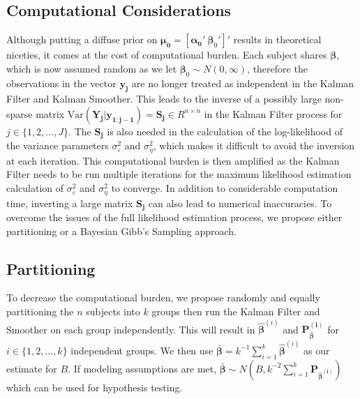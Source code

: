 \documentclass[
]{article}
\begin{document}
\hypertarget{computational-considerations}{%
\subsection{Computational Considerations}\label{computational-considerations}}

Although putting a diffuse prior on \(\boldsymbol{\mu_{0}} = [\boldsymbol{\alpha_{0}}' \ \boldsymbol{\beta}_{0}']'\) results in theoretical niceties, it comes at the cost of computational burden. Each subject shares \(\boldsymbol{\beta}\), which is now assumed random as we let \(\boldsymbol{\beta}_0 \sim N(0, \infty)\), therefore the observations in the vector \(\boldsymbol{y_j}\) are no longer treated as independent in the Kalman Filter and Kalman Smoother. This leads to the inverse of a possibly large non-sparse matrix \(\text{Var}(\boldsymbol{Y_j}|\boldsymbol{y_{1:j-1}}) = \boldsymbol{S_j} \in R^{n\times n}\) in the Kalman Filter process for \(j \in \{1, 2, ..., J\}\). The \(\boldsymbol{S_j}\) is also needed in the calculation of the log-likelihood of the variance parameters \(\sigma^2_\varepsilon\) and \(\sigma^2_\eta\), which makes it difficult to avoid the inversion at each iteration. This computational burden is then amplified as the Kalman Filter needs to be run multiple iterations for the maximum likelihood estimation calculation of \(\sigma^2_\varepsilon\) and \(\sigma^2_\eta\) to converge. In addition to considerable computation time, inverting a large matrix \(\boldsymbol{S_j}\) can also lead to numerical inaccuracies. To overcome the issues of the full likelihood estimation process, we propose either partitioning or a Bayesian Gibb's Sampling approach.

\hypertarget{partitioning}{%
\subsection{Partitioning}\label{partitioning}}

To decrease the computational burden, we propose randomly and equally partitioning the \(n\) subjects into \(k\) groups then run the Kalman Filter and Smoother on each group independently. This will result in \(\boldsymbol{\hat\beta}^{(i)}\) and \(\boldsymbol{P^{(i)}_{\boldsymbol{\hat\beta}}}\) for \(i \in \{1, 2, ..., k\}\) independent groups. We then use \(\boldsymbol{\bar\beta} = k^{-1}\sum_{i=1}^k \boldsymbol{\hat\beta}^{(i)}\) as our estimate for \(B\). If modeling assumptions are met, \(\boldsymbol{\bar\beta} \sim N(B, k^{-2}\sum_{i=1}^k\boldsymbol{P_{\boldsymbol{\hat\beta}^{(i)}}})\) which can be used for hypothesis testing.
\end{document}
